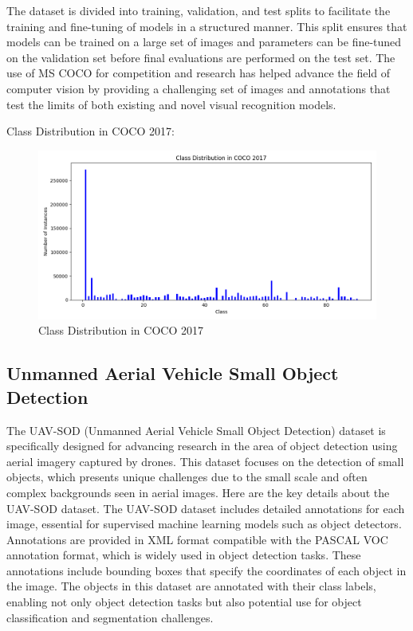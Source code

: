 The dataset is divided into training, validation, and test splits to facilitate the training and fine-tuning of models in a structured manner. 
This split ensures that models can be trained on a large set of images and parameters can be fine-tuned on the validation set before final evaluations 
are performed on the test set. The use of MS COCO for competition and research has helped advance the field of computer vision by providing a challenging 
set of images and annotations that test the limits of both existing and novel visual recognition models.

Class Distribution in COCO 2017:

\begin{figure}[h!]
    \centering
    \includegraphics[scale=0.55]{Figures/coco2017_class_distribution.png}
    \caption{Class Distribution in COCO 2017}
    \label{fig:coco-class}
\end{figure}

\subsection{Unmanned Aerial Vehicle Small Object Detection}

The UAV-SOD (Unmanned Aerial Vehicle Small Object Detection)  \cite{UAVSmallObjectKaggle}  dataset is specifically designed for advancing research in the area of object 
detection using aerial imagery captured by drones. This dataset focuses on the detection of small objects, which presents unique challenges due to the small 
scale and often complex backgrounds seen in aerial images. Here are the key details about the UAV-SOD dataset. The UAV-SOD dataset includes detailed annotations 
for each image, essential for supervised machine learning models such as object detectors. Annotations are provided in XML format compatible with the PASCAL VOC 
annotation format, which is widely used in object detection tasks. These annotations include bounding boxes that specify the coordinates of each object in the image. 
The objects in this dataset are annotated with their class labels, enabling not only object detection tasks but also potential use for object classification 
and segmentation challenges.

